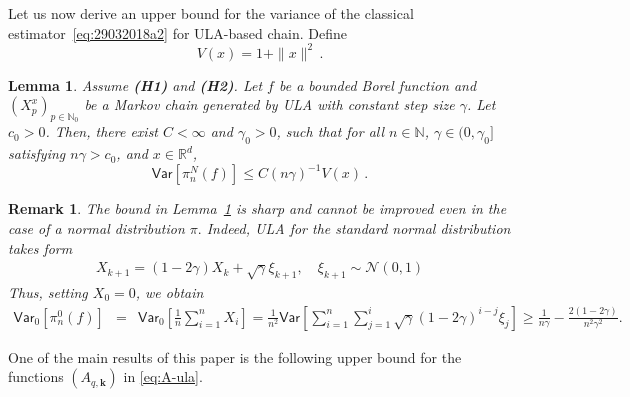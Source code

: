 \documentclass[bj]{imsart}
\def\PVar{\mathsf{Var}}
\def\nset{\mathbb{N}}
\def\rset{\mathbb{R}}
\def\rset{\mathbb{R}}
\newtheorem{lem}[thm]{Lemma}
\newtheorem{remark}[thm]{Remark}
\def\eqsp{\,}
\begin{document}
 Let us now derive an upper bound for the variance of the classical estimator~\eqref{eq:29032018a2} for ULA-based chain. Define
 \begin{equation}
 \label{eq:definition-V}
 V(x) = 1+ \|x\|^2 \,.
 \end{equation}
\begin{lem}
\label{lem:variance}
Assume {\bf (H1)} and {\bf (H2)}.
Let $f$ be a bounded Borel function and $(X^x_{p})_{p \in \nset_0}$ be a Markov chain generated by ULA with constant step size $\gamma$.
Let $c_0>0$. Then, there exist $C < \infty$ and $\gamma_0 > 0$, such that for all $n \in \nset$, $\gamma \in (0,\gamma_0]$ satisfying $n\gamma > c_0$, and $x \in \rset^d$,
\begin{equation}
\label{eq:var-mc}
\PVar\left[\pi_n^N(f)\right]\leq C (n \gamma)^{-1} V(x) \eqsp.
\end{equation}
\end{lem}
\begin{remark}
\label{rem:var-low}
The bound in Lemma~\ref{lem:variance} is sharp and cannot be improved even in the case of a normal distribution $\pi.$
Indeed,  ULA for the standard normal distribution takes form
\begin{eqnarray*}
X_{k+1} = (1-2\gamma)X_k + \sqrt{\gamma}\xi_{k+1},\quad \xi_{k+1} \sim \mathcal{N}(0,1)
\end{eqnarray*}
Thus, setting $X_0 = 0$, we obtain
\begin{eqnarray*}
\PVar_{0} [\pi_n^0(f)] &=& \PVar_{0}\left[\frac{1}{n}\sum\limits_{i=1}^{n}X_i\right]
= \frac{1}{n^2}\PVar\left[\sum\limits_{i=1}^{n}\sum\limits_{j=1}^{i}\sqrt{\gamma}(1-2\gamma)^{i-j}\xi_{j}\right]
\geq  \frac{1}{n\gamma} - \frac{2(1-2\gamma)}{n^2\gamma^2}.
\end{eqnarray*}
\end{remark}
One of the main results of this paper is the following  upper bound for the functions $(A_{q,\mathbf{k}})$ in \eqref{eq:A-ula}.
\end{document}
